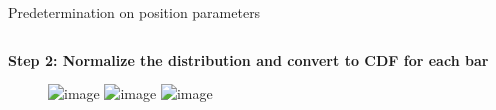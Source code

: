 \documentclass{ikpKoeln}
\begin{document}
\begin{frame}[t]{Predetermination on position parameters}
	\vspace*{-1em}
	\begin{columns}[t]
		\begin{column}[t]{0.48\textwidth}
			\textbf{\footnotesize Step 2: Normalize the distribution and convert to CDF for each bar}\\
			\begin{figure}[t]
				\vspace*{-0.5em}
				\centering
				\includegraphics<1>[height = 0.47\textheight]{R3BCon2024GSI/CDF_275.png}
				\includegraphics<2>[height = 0.47\textheight]{R3BCon2024GSI/CDF_275_fitted.png}
				\includegraphics<3>[height = 0.47\textheight]{R3BCon2024GSI/CDF_275_fitted.png}
			\end{figure}
		\end{column}
		\begin{column}[t]{0.48\textwidth}
\end{column}
\end{columns}
\end{frame}
\end{document}
